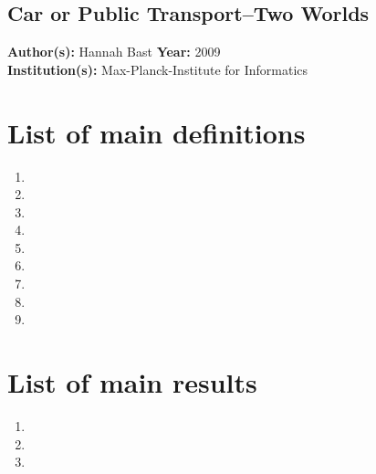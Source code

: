 \documentclass[a4paper]{article}
\newif\ifmine %
\newcommand{\textbff}[1]{{\large \textbf{#1}}}
\begin{document}
        \subsection{Car or Public Transport--Two Worlds}
        \label{subsec:twoworlds}
        \textbff{Author(s): } Hannah Bast
        \textbff{Year: }2009 \\
        \textbff{Institution(s): } Max-Planck-Institute for Informatics

    \section{List of main definitions}
        \begin{enumerate}
\ifmine
            \item \defspanner
            \item \defgirth
\fi
            \item {}
            \item {}
            \item {}
            \item {}
            \item {}
            \item {}
            \item {}
            \item {}
            \item {}
        \end{enumerate}

    \section{List of main results}
        \begin{enumerate}
            \item \resthzwck
\ifmine
            \item \resspangirth
            \item \resgirthtwok
            \item \reseveryspanner
            \item \reserdos
\fi
            \item \resseparator
            \item \restimelabelgeneral
        \end{enumerate}
\end{document}
